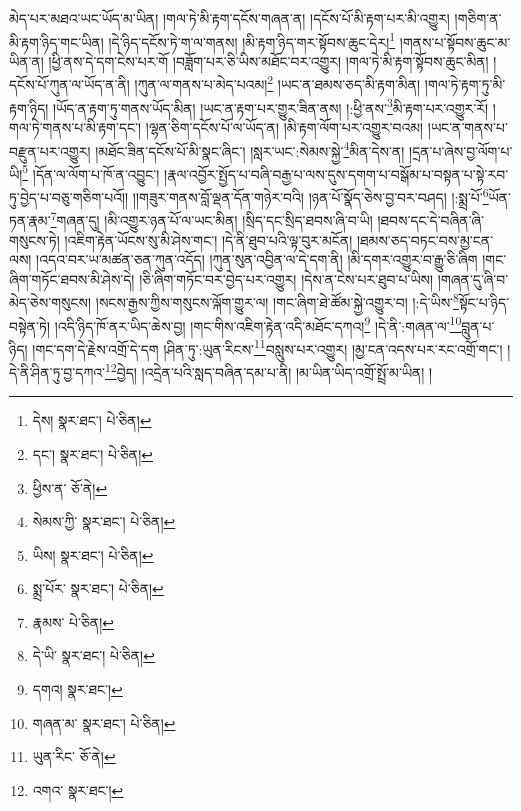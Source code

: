 མེད་པར་མཐའ་ཡང་ཡོད་མ་ཡིན། །གལ་ཏེ་མི་རྟག་དངོས་གཞན་ན། །དངོས་པོ་མི་རྟག་པར་མི་འགྱུར། །གཅིག་ན་མི་རྟག་ཉིད་གང་ཡིན། །དེ་ཉིད་དངོས་ཏེ་ག་ལ་གནས། །མི་རྟག་ཉིད་གར་སྟོབས་ཆུང་དེར།\footnote{དེས།  སྣར་ཐང་།  པེ་ཅིན། } །གནས་པ་སྟོབས་ཆུང་མ་ཡིན་ན། །ཕྱི་ནས་དེ་དག་ངེས་པར་གོ །བཟློག་པར་ཅི་ཡིས་མཐོང་བར་འགྱུར། །གལ་ཏེ་མི་རྟག་སྟོབས་ཆུང་མིན། །དངོས་པོ་ཀུན་ལ་ཡོད་ན་ནི། །ཀུན་ལ་གནས་པ་མེད་པའམ།\footnote{དང་།  སྣར་ཐང་།  པེ་ཅིན། } །ཡང་ན་ཐམས་ཅད་མི་རྟག་མིན། །གལ་ཏེ་རྟག་ཏུ་མི་རྟག་ཉིད། །ཡོད་ན་རྟག་ཏུ་གནས་ཡོད་མིན། །ཡང་ན་རྟག་པར་གྱུར་ཟིན་ནས། །:ཕྱི་ནས་\footnote{ཕྱིས་ན་  ཅོ་ནེ། }མི་རྟག་པར་འགྱུར་རོ། །གལ་ཏེ་གནས་པ་མི་རྟག་དང་། །ལྷན་ཅིག་དངོས་པོ་ལ་ཡོད་ན། །མི་རྟག་ལོག་པར་འགྱུར་བའམ། །ཡང་ན་གནས་པ་བརྫུན་པར་འགྱུར། །མཐོང་ཟིན་དངོས་པོ་མི་སྣང་ཞིང་། །སླར་ཡང་:སེམས་སྐྱེ་\footnote{སེམས་ཀྱི་  སྣར་ཐང་།  པེ་ཅིན། }མིན་དེས་ན། །དྲན་པ་ཞེས་བྱ་ལོག་པ་ཡི།\footnote{ཡིས།  སྣར་ཐང་།  པེ་ཅིན། } །དོན་ལ་ལོག་པ་ཁོ་ན་འབྱུང་། །རྣལ་འབྱོར་སྤྱོད་པ་བཞི་བརྒྱ་པ་ལས་དུས་དགག་པ་བསྒོམ་པ་བསྟན་པ་སྟེ་རབ་ཏུ་བྱེད་པ་བཅུ་གཅིག་པའོ།། །།གཟུར་གནས་བློ་ལྡན་དོན་གཉེར་བའི། །ཉན་པོ་སྣོད་ཅེས་བྱ་བར་བཤད། །:སྨྲ་པོ་\footnote{སྨྲ་པོར་  སྣར་ཐང་།  པེ་ཅིན། }ཡོན་ཏན་རྣམ་\footnote{རྣམས་  པེ་ཅིན། }གཞན་དུ། །མི་འགྱུར་ཉན་པོ་ལ་ཡང་མིན། །སྲིད་དང་སྲིད་ཐབས་ཞི་བ་ཡི། །ཐབས་དང་དེ་བཞིན་ཞི་གསུངས་ཏེ། །འཇིག་རྟེན་ཡོངས་སུ་མི་ཤེས་གང་། །དེ་ནི་ཐུབ་པའི་ལྟ་བུར་མངོན། །ཐམས་ཅད་བཏང་བས་མྱ་ངན་ལས། །འདའ་བར་ཡ་མཚན་ཅན་ཀུན་འདོད། །ཀུན་སུན་འབྱིན་ལ་དེ་དག་ནི། །མི་དགར་འགྱུར་བ་རྒྱུ་ཅི་ཞིག །གང་ཞིག་གཏོང་ཐབས་མི་ཤེས་དེ། །ཅི་ཞིག་གཏོང་བར་བྱེད་པར་འགྱུར། །དེས་ན་ངེས་པར་ཐུབ་པ་ཡིས། །གཞན་དུ་ཞི་བ་མེད་ཅེས་གསུངས། །སངས་རྒྱས་ཀྱིས་གསུངས་ལྐོག་གྱུར་ལ། །གང་ཞིག་ཐེ་ཚོམ་སྐྱེ་འགྱུར་བ། །:དེ་ཡིས་\footnote{དེ་ཡི་  སྣར་ཐང་།  པེ་ཅིན། }སྟོང་པ་ཉིད་བསྟེན་ཏེ། །འདི་ཉིད་ཁོ་ནར་ཡིད་ཆེས་བྱ། །གང་གིས་འཇིག་རྟེན་འདི་མཐོང་དཀའ།\footnote{དགའ།  སྣར་ཐང་། } །དེ་ནི་:གཞན་ལ་\footnote{གཞན་མ་  སྣར་ཐང་།  པེ་ཅིན། }བླུན་པ་ཉིད། །གང་དག་དེ་རྗེས་འགྲོ་དེ་དག །ཤིན་ཏུ་:ཡུན་རིངས་\footnote{ཡུན་རིང་  ཅོ་ནེ། }བསླུས་པར་འགྱུར། །མྱ་ངན་འདས་པར་རང་འགྲོ་གང་། །དེ་ནི་ཤིན་ཏུ་བྱ་དཀའ་\footnote{འགའ་  སྣར་ཐང་། }བྱེད། །འདྲེན་པའི་སླད་བཞིན་དམ་པ་ནི། །མ་ཡིན་ཡིད་འགྲོ་སྤྲོ་མ་ཡིན། །
